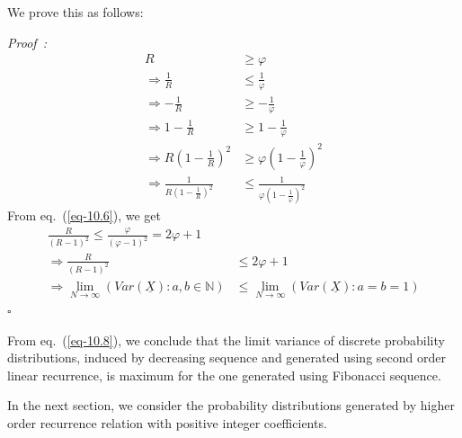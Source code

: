 \begin{multicols}{2}
\vspace{-.7cm}

We prove this as follows:

\vspace{-.3cm}

{\it Proof~:}
\begin{align}
 R &\ge \varphi\nonumber\\
 \Rightarrow \frac{1}{R} &\le \frac{1}{\varphi}\nonumber\\
\Rightarrow -\frac{1}{R} &\ge - \frac{1}{\varphi}\nonumber\\
\Rightarrow 1-\frac{1}{R} &\ge 1 - \frac{1}{\varphi}\nonumber\\
\Rightarrow R\left(1-\frac{1}{R}\right)^2 &\ge \varphi\left(1 - \frac{1}{\varphi}\right)^2\nonumber\\
\Rightarrow \frac{1}{R\left(1-\frac{1}{R}\right)^2} &\le \frac{1}{\varphi\left(1 - \frac{1}{\varphi}\right)^2}\label{eq-10.6}
\end{align}
From eq.~(\ref{eq-10.6}), we get 
{\fontsize{8}{9}\selectfont\begin{align}
\frac{R}{(R-1)^2} \le \frac{\varphi}{(\varphi-1)^2} = 2\varphi + 1\nonumber\\
\Rightarrow \frac{R}{(R-1)^2} &\le 2\varphi + 1\label{eq-10.7}\\
\Rightarrow \lim_{N\rightarrow \infty} \left(Var(\underline{X}):a,b\in \mathbb N\right) &\leq \lim_{N\rightarrow \infty}\left(Var(\underline{X}): a = b = 1\right)\label{eq-10.8}
\end{align}}
\hfill{$\square$}

\vspace{-.4cm}

From eq.~(\ref{eq-10.8}), we conclude that the limit variance of discrete probability distributions, induced by decreasing sequence and generated using second order linear recurrence, is maximum for the one generated using Fibonacci sequence.

In the next section, we consider the probability distributions generated by higher order recurrence relation with positive integer coefficients.


\end{multicols}
